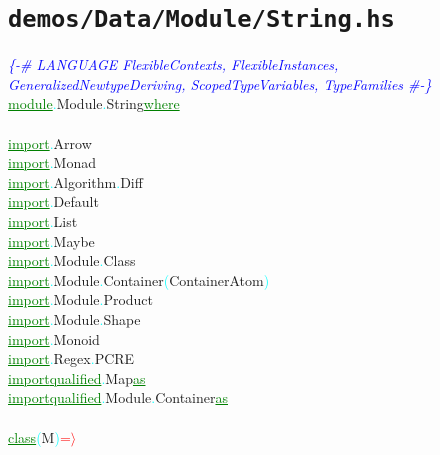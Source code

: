 \section{\texttt{demos/Data/Module/String.hs}}
\label{mod:Data.Module.String}
\textcolor{blue}{{\it{}\{-\# LANGUAGE FlexibleContexts, FlexibleInstances, GeneralizedNewtypeDeriving, ScopedTypeVariables, TypeFamilies \#-\}}}\\\textcolor{green}{\underline{module}}\textcolor{cyan}{.}{\rm{}Module}\textcolor{cyan}{.}{\rm{}String}\hsspace \textcolor{green}{\underline{where}}\\\\\textcolor{green}{\underline{import}}\textcolor{cyan}{.}{\rm{}Arrow}\\\textcolor{green}{\underline{import}}\textcolor{cyan}{.}{\rm{}Monad}\\\textcolor{green}{\underline{import}}\textcolor{cyan}{.}{\rm{}Algorithm}\textcolor{cyan}{.}{\rm{}Diff}\\\textcolor{green}{\underline{import}}\textcolor{cyan}{.}{\rm{}Default}\\\textcolor{green}{\underline{import}}\textcolor{cyan}{.}{\rm{}List}\\\textcolor{green}{\underline{import}}\textcolor{cyan}{.}{\rm{}Maybe}\\\textcolor{green}{\underline{import}}\textcolor{cyan}{.}{\rm{}Module}\textcolor{cyan}{.}{\rm{}Class}\\\textcolor{green}{\underline{import}}\textcolor{cyan}{.}{\rm{}Module}\textcolor{cyan}{.}{\rm{}Container}\hsspace \textcolor{cyan}{(}{\rm{}ContainerAtom}\textcolor{cyan}{)}\\\textcolor{green}{\underline{import}}\textcolor{cyan}{.}{\rm{}Module}\textcolor{cyan}{.}{\rm{}Product}\\\textcolor{green}{\underline{import}}\textcolor{cyan}{.}{\rm{}Module}\textcolor{cyan}{.}{\rm{}Shape}\\\textcolor{green}{\underline{import}}\textcolor{cyan}{.}{\rm{}Monoid}\\\textcolor{green}{\underline{import}}\textcolor{cyan}{.}{\rm{}Regex}\textcolor{cyan}{.}{\rm{}PCRE}\\\textcolor{green}{\underline{import}}\hsspace \textcolor{green}{\underline{qualified}}\textcolor{cyan}{.}{\rm{}Map}\hsspace \textcolor{green}{\underline{as}}\\\textcolor{green}{\underline{import}}\hsspace \textcolor{green}{\underline{qualified}}\textcolor{cyan}{.}{\rm{}Module}\textcolor{cyan}{.}{\rm{}Container}\hsspace \textcolor{green}{\underline{as}}\\\\\textcolor{green}{\underline{class}}\hsspace \textcolor{cyan}{(}{\rm{}M}\textcolor{cyan}{)}\hsspace \textcolor{red}{=\ensuremath{\rangle}}\hsspace 